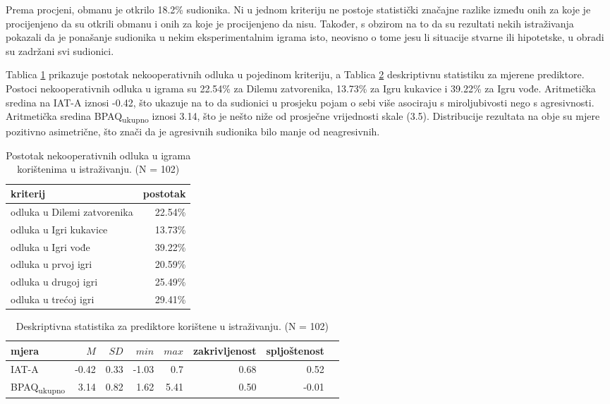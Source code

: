 \documentclass[a4paper, 12pt]{report}
\begin{document}
Prema procjeni, obmanu je otkrilo 18.2\% sudionika. 
Ni u jednom kriteriju ne postoje statistički značajne
razlike između onih za koje je procijenjeno da su otkrili obmanu i onih za koje
je procijenjeno da nisu.
Također, s obzirom na to da su rezultati nekih istraživanja
\citep{ben2008economic} pokazali da je ponašanje sudionika u nekim
eksperimentalnim igrama isto, neovisno o tome jesu li situacije stvarne ili
hipotetske, u obradi su zadržani svi sudionici.

Tablica \ref{deskr krit} prikazuje postotak nekooperativnih odluka u
pojedinom kriteriju, a Tablica \ref{deskr pred} deskriptivnu statistiku za mjerene
prediktore.
Postoci nekooperativnih odluka u igrama su 22.54\% za Dilemu zatvorenika, 13.73\% za Igru
kukavice  i 39.22\% za Igru vođe. 
Aritmetička sredina na IAT-A iznosi -0.42, što ukazuje na
to da sudionici u prosjeku pojam o sebi više asociraju s miroljubivosti
nego s agresivnosti. 
Aritmetička sredina BPAQ\textsubscript{ukupno} iznosi 3.14, što je nešto niže od
prosječne vrijednosti skale (3.5).
Distribucije rezultata na obje su mjere pozitivno
asimetrične, što znači da je agresivnih sudionika bilo manje od neagresivnih.

\begin{table}
    \caption{Postotak nekooperativnih odluka u igrama korištenima u istraživanju. (N =
        102)\label{deskr krit}}
    \centering
    \begin{tabular}{l*{1}{r}}
        \toprule
        kriterij & postotak\\
        \midrule
        odluka u Dilemi zatvorenika & 22.54\% \\
        odluka u Igri kukavice & 13.73\% \\
        odluka u Igri vođe & 39.22\% \\
        odluka u prvoj igri & 20.59\% \\
        odluka u drugoj igri & 25.49\% \\
        odluka u trećoj igri & 29.41\% \\
        \bottomrule
    \end{tabular}
\end{table}

\begin{table}[h]
    \caption{Deskriptivna statistika za prediktore korištene u 
        istraživanju. (N = 102)\label{deskr pred}}
    \centering
    \begin{tabular}{l*{7}{r}}
        \toprule
        mjera & $M$ & $SD$ & $min$ & $max$ & zakrivljenost & spljoštenost\\
        \midrule
        IAT-A & -0.42 & 0.33 & -1.03 & 0.7 & 0.68 & 0.52\\
        BPAQ\textsubscript{ukupno} & 3.14 & 0.82 & 1.62 & 5.41 & 0.50 & -0.01\\
        \bottomrule
    \end{tabular}
\end{table}
\end{document}
